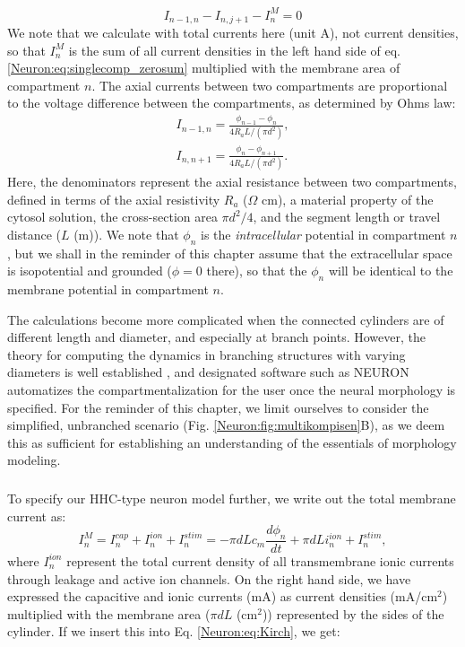 \begin{equation}
I_{n-1,n} - I_{n,j+1} - I^M_n = 0
\label{Neuron:eq:Kirch}
\end{equation}
We note that we calculate with total currents here (unit A), not current densities, so that $I^M_n$ is the sum of all current densities in the left hand side of eq. \ref{Neuron:eq:singlecomp_zerosum} multiplied with the membrane area of compartment $n$. The axial currents between two compartments are proportional to the voltage difference between the compartments, as determined by Ohms law:
\begin{eqnarray}
I_{n-1,n} = \frac{\phi_{n-1}-\phi_n}{4 R_a L/(\pi d^2)}, \nonumber \\ 
I_{n,n+1} = \frac{\phi_{n}-\phi_{n+1}}{4 R_a L/(\pi d^2)}.
\label{Neuron:eq:axialcurrents}
\end{eqnarray}
Here, the denominators represent the axial resistance between two compartments, defined in terms of the axial resistivity $R_a$ ($\Omega$ cm), a material property of the cytosol solution, the cross-section area $\pi d^2/4$, and the segment length or travel distance ($L$ (m)). We note that $\phi_n$ is the \emph{intracellular} potential in compartment $n$, but we shall in the reminder of this chapter assume that the extracellular space is isopotential and grounded ($\phi = 0$ there), so that the $\phi_n$ will be identical to the membrane potential in compartment $n$.

The calculations become more complicated when the connected cylinders are of different length and diameter, and especially at branch points. However, the theory for computing the dynamics in branching structures with varying diameters is well established \cite{Rall1977,Rall1989}, and designated software such as NEURON \cite{Hines1997, Hines2009} automatizes the compartmentalization for the user once the neural morphology is specified. For the reminder of this chapter, we limit ourselves to consider the simplified, unbranched scenario (Fig. \ref{Neuron:fig:multikompisen}B), as we deem this as sufficient for establishing an understanding of the essentials of morphology modeling. 




\subsubsection{}
\label{sec:Neuron:Active_multicomp}
To specify our HHC-type neuron model further, we write out the total membrane current as:
\begin{equation}
I^M_n = I_n^{cap} + I_n^{ion} + I_n^{stim} = -\pi d L c_m \frac{d\phi_n}{dt} + \pi d L i_n^{ion} + I_n^{stim}, 
\label{Neuron:eq:Imemb}
\end{equation}
where $I_n^{ion}$ represent the total current density of all transmembrane ionic currents through leakage and active ion channels. On the right hand side, we have expressed the capacitive and ionic currents (mA) as current densities (mA/cm$^2$) multiplied with the membrane area ($\pi d L$ (cm$^2$)) represented by the sides of the cylinder. If we insert this into Eq. \ref{Neuron:eq:Kirch}, we get:

